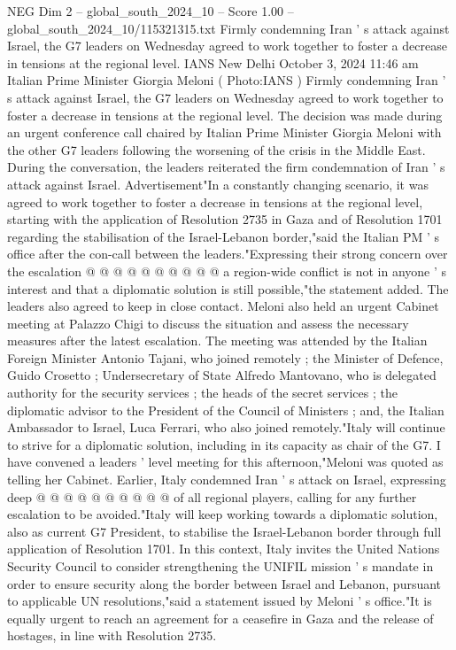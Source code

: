 \begin{textsample}{NEG Dim 2 – global\_south\_2024\_10 – Score 1.00 – global\_south\_2024\_10/115321315.txt}  \label{ex:f2_neg_316}
Firmly condemning Iran ' s attack against Israel, the G7 leaders on Wednesday agreed to work together to foster a decrease in tensions at the regional level.
IANS New Delhi October 3, 2024 11:46 am Italian Prime Minister Giorgia Meloni ( Photo:IANS ) Firmly condemning Iran ' s attack against Israel, the G7 leaders on Wednesday agreed to work together to foster a decrease in tensions at the regional level.
The decision was made during an urgent conference call chaired by Italian Prime Minister Giorgia Meloni with the other G7 leaders following the worsening of the crisis in the Middle East.
During the conversation, the leaders reiterated the firm condemnation of Iran ' s attack against Israel.
Advertisement"In a constantly changing scenario, it was agreed to work together to foster a decrease in tensions at the regional level, starting with the application of Resolution 2735 in Gaza and of Resolution 1701 regarding the stabilisation of the Israel-Lebanon border,"said the Italian PM ' s office after the con-call between the leaders."Expressing their strong concern over the escalation @ @ @ @ @ @ @ @ @ @ a region-wide conflict is not in anyone ' s interest and that a diplomatic solution is still possible,"the statement added.
The leaders also agreed to keep in close contact.
Meloni also held an urgent Cabinet meeting at Palazzo Chigi to discuss the situation and assess the necessary measures after the latest escalation.
The meeting was attended by the Italian Foreign Minister Antonio Tajani, who joined remotely ; the Minister of Defence, Guido Crosetto ; Undersecretary of State Alfredo Mantovano, who is delegated authority for the security services ; the heads of the secret services ; the diplomatic advisor to the President of the Council of Ministers ; and, the Italian Ambassador to Israel, Luca Ferrari, who also joined remotely."Italy will continue to strive for a diplomatic solution, including in its capacity as chair of the G7.
I have convened a leaders ' level meeting for this afternoon,"Meloni was quoted as telling her Cabinet.
Earlier, Italy condemned Iran ' s attack on Israel, expressing deep @ @ @ @ @ @ @ @ @ @ of all regional players, calling for any further escalation to be avoided."Italy will keep working towards a diplomatic solution, also as current G7 President, to stabilise the Israel-Lebanon border through full application of Resolution 1701.
In this context, Italy invites the United Nations Security Council to consider strengthening the UNIFIL mission ' s mandate in order to ensure security along the border between Israel and Lebanon, pursuant to applicable UN resolutions,"said a statement issued by Meloni ' s office."It is equally urgent to reach an agreement for a ceasefire in Gaza and the release of hostages, in line with Resolution 2735.

\end{textsample}
